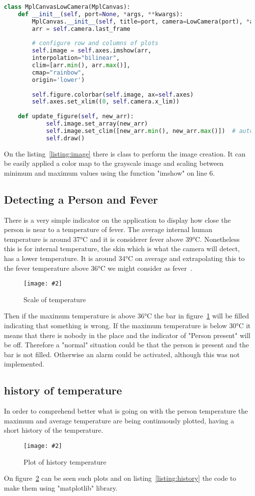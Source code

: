 \documentclass[hidelinks,11pt,a4paper,oneside,article]{memoir}
\newcommand{\putimage}[3][10] %
{
\begin{figure}[h]
    \centering
    \captionsetup{justification=centering}
    \texttt{[image: \#2]}
    \caption{#3}
    \label{fig:#2}
\end{figure}
}
\begin{document}
\begin{lstlisting}[label={listing:image},caption={Class to get serial data from the cameras},language=Python, style=styleprogramming]
class MplCanvasLowCamera(MplCanvas):
    def __init__(self, port=None, *args, **kwargs):
        MplCanvas.__init__(self, title=port, camera=LowCamera(port), *args, **kwargs)
        arr = self.camera.last_frame
        
        # configure row and columns of plots
        self.image = self.axes.imshow(arr,
        interpolation="bilinear",
        clim=[arr.min(), arr.max()],
        cmap="rainbow",
        origin='lower')
        
        self.figure.colorbar(self.image, ax=self.axes)
        self.axes.set_xlim((0, self.camera.x_lim))
    
    def update_figure(self, new_arr):
            self.image.set_array(new_arr)
            self.image.set_clim([new_arr.min(), new_arr.max()])  # autoscale
            self.draw()

\end{lstlisting}

On the listing~\ref{listing:image} there is class to perform the image creation. It can be easily applied a color map to the grayscale image and scaling between minimum and maximum values using the function "imshow" on line 6.


\subsection{Detecting a Person and Fever}
There is a very simple indicator on the application to display how close the person is near to a temperature of fever. The average internal human temperature is around 37°C and it is considerer fever above 39°C. Nonetheless this is for internal temperature, the skin which is what the camera will detect, has a lower temperature. It is around 34°C on average and extrapolating this to the fever temperature above 36°C we might consider as fever~\cite{abantyTemp}.
    \putimage{fever}{Scale of temperature}
Then if the maximum temperature is above 36°C the bar in figure~\ref{fig:fever} will be filled indicating that something is wrong. If the maximum temperature is below 30°C it means that there is nobody in the place and the indicator of "Person present" will be off. Therefore a "normal" situation could be that the person is present and the bar is not filled. Otherwise an alarm could be activated, although this was not implemented.
\subsection{history of temperature}
In order to comprehend better what is going on with the person temperature the maximum and average temperature are being continuously plotted, having a short history of the temperature.
    \putimage{history}{Plot of history temperature}
On figure~\ref{fig:history} can be seen such plots and on listing~\ref{listing:history} the code to make them using "matplotlib" library.
\end{document}
